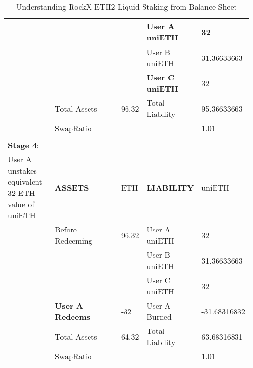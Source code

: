 \documentclass{article}
\begin{document}
\begin{table}[!ht]
\begin{tabular}{p{0.2\linewidth} | p{0.3\linewidth}| p{0.1\linewidth}| p{0.2\linewidth}| p{0.2\linewidth}}
        ~ & ~ & ~ & User A uniETH & 32 \\ \hline
        ~ & ~ & ~ & User B uniETH & 31.36633663 \\ \hline
        ~ & ~ & ~ & \textbf{User C uniETH} & 32 \\ \hline
        ~ & Total Assets & 96.32 & Total Liability & 95.36633663 \\ \hline
        ~ & SwapRatio & ~ & ~ & 1.01 \\ \hline
        \multicolumn{5}{c}{} \\ \hline
        \textbf{Stage 4}: & ~ & ~ & ~ & ~ \\ \hline
          User A unstakes equivalent 32 ETH value of uniETH & \textbf{ASSETS} & ETH & \textbf{LIABILITY} & uniETH \\ \hline
        ~ & Before Redeeming & 96.32 & User A uniETH & 32 \\ \hline
        ~ & ~ & ~ & User B uniETH & 31.36633663 \\ \hline
        ~ & ~ & ~ & User C uniETH & 32 \\ \hline
        ~ & \textbf{User A Redeems} & -32 & User A Burned & -31.68316832 \\ \hline
        ~ & Total Assets & 64.32 & Total Liability & 63.68316831 \\ \hline
        ~ & SwapRatio & ~ & ~ & 1.01 \\ \hline
    \end{tabular}
    \caption{Understanding RockX ETH2 Liquid Staking from Balance Sheet}
\end{table}
\end{document}
